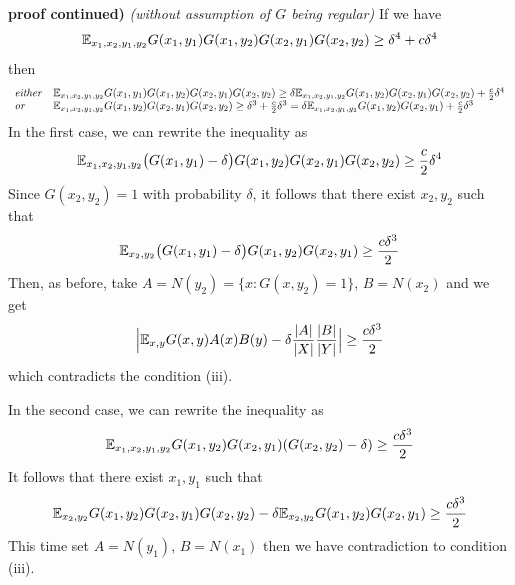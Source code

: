 \documentclass[12pt,a4paper]{report}
\newenvironment{proof}
{\begin{changemargin}{1cm}{0.5cm}
	}%
	{\end{changemargin}
}
\begin{document}
\begin{proof}
\textbf{proof continued)} \emph{(without assumption of $G$ being regular)} If we have
\begin{align*}
\mathbb{E}_{x_1, x_2, y_1, y_2} G(x_1, y_1) G(x_1,y_2) G(x_2,y_1) G(x_2,y_2) \geq \delta^4 + c\delta^4
\end{align*}
then
\begin{align*}
\begin{array}{ll}
\text{\emph{either}} & \mathbb{E}_{x_1, x_2, y_1, y_2} G(x_1, y_1) G(x_1,y_2) G(x_2,y_1) G(x_2,y_2) \geq \delta \mathbb{E}_{x_1, x_2, y_1, y_2} G(x_1,y_2) G(x_2,y_1) G(x_2,y_2) + \frac{c}{2} \delta^4 \\
\text{\emph{or}} & \mathbb{E}_{x_1, x_2, y_1, y_2} G(x_1,y_2) G(x_2,y_1) G(x_2,y_2) \geq \delta^3 + \frac{c}{2}\delta^3 = \delta \mathbb{E}_{x_1, x_2, y_1, y_2} G(x_1,y_2) G(x_2,y_1) + \frac{c}{2}\delta^3
\end{array}
\end{align*}
In the first case, we can rewrite the inequality as
\begin{align*}
\mathbb{E}_{x_1, x_2, y_1, y_2} \big( G(x_1,y_1) -\delta \big) G(x_1,y_2) G(x_2,y_1) G(x_2,y_2) \geq \frac{c}{2} \delta^4
\end{align*}
Since $G(x_2, y_2)=1$ with probability $\delta$, it follows that there exist $x_2, y_2$ such that
\begin{align*}
\mathbb{E}_{x_2, y_2} \big( G(x_1,y_1) -\delta \big) G(x_1,y_2) G(x_2,y_1) \geq \frac{c\delta^3}{2}
\end{align*}
Then, as before, take $A = N(y_2)= \{ x:G(x,y_2)=1 \}$, $B=N(x_2)$ and we get
\begin{align*}
\Big| \mathbb{E}_{x,y} G(x,y) A(x)B(y) - \delta \frac{|A|}{|X|} \frac{|B|}{|Y|} \Big| \geq \frac{c\delta^3}{2}
\end{align*}
which contradicts the condition (iii).

\quad In the second case, we can rewrite the inequality as
\begin{align*}
\mathbb{E}_{x_1, x_2, y_1, y_2} G(x_1,y_2) G(x_2,y_1) (G(x_2,y_2) - \delta) \geq \frac{c\delta^3}{2}
\end{align*}
It follows that there exist $x_1, y_1$ such that
\begin{align*}
\mathbb{E}_{x_2, y_2} G(x_1,y_2) G(x_2,y_1) G(x_2,y_2) - \delta \mathbb{E}_{x_2, y_2} G(x_1,y_2) G(x_2,y_1) \geq \frac{c\delta^3}{2}
\end{align*}
This time set $A = N(y_1)$, $B=N(x_1)$ then we have contradiction to condition (iii).

\eop
\end{proof}
\end{document}
